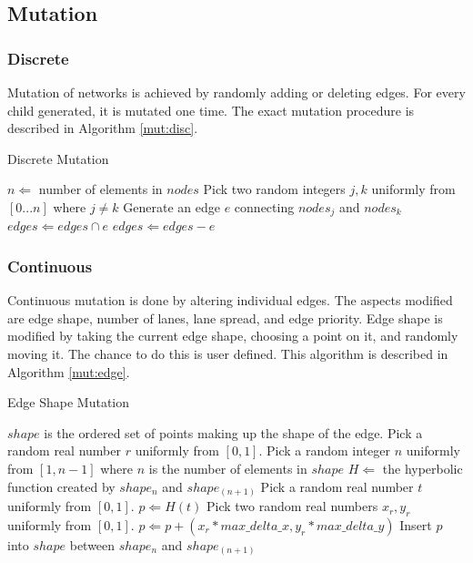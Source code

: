 \documentclass[11pt, oneside, notitlepage, draft]{article}
\begin{document}
        \subsection{Mutation}
            
            \subsubsection{Discrete}
            Mutation of networks is achieved by randomly adding or deleting edges. For every child generated, it is mutated one time. The exact mutation procedure is described in Algorithm \ref{mut:disc}.

            \begin{algorithm}
            \caption{Discrete Mutation}
            \label{mut:disc}
            \begin{algorithmic}
            \STATE $n \Leftarrow $ number of elements in $nodes$
            \STATE Pick two random integers $j, k$ uniformly from $[0...n]$ where $j \neq k$
            \STATE Generate an edge $e$ connecting $nodes_j$ and $nodes_k$
            \STATE $edges \Leftarrow edges \cap e$
            \ELSE
            \STATE $edges \Leftarrow edges - e$
            \ENDIF
            \end{algorithmic}
            \end{algorithm}

            \subsubsection{Continuous}
            Continuous mutation is done by altering individual edges. The aspects modified are edge shape, number of lanes, lane spread, and edge priority.
            Edge shape is modified by taking the current edge shape, choosing a point on it, and randomly moving it. The chance to do this is user defined. This algorithm is described in Algorithm \ref{mut:edge}.

            \begin{algorithm}
            \caption{Edge Shape Mutation}
            \label{mut:edge}
            \begin{algorithmic}
            \STATE $shape$ is the ordered set of points making up the shape of the edge.
            \STATE Pick a random real number $r$ uniformly from $[0, 1]$.
            \STATE Pick a random integer $n$ uniformly from $[1, n-1]$ where $n$ is the number of elements in $shape$
            \STATE $H \Leftarrow$ the hyperbolic function created by $shape_n$ and $shape_{(n+1)}$
            \STATE Pick a random real number $t$ uniformly from $[0, 1]$.
            \STATE $p \Leftarrow H(t)$
            \STATE Pick two random real numbers $x_r, y_r$ uniformly from $[0, 1]$.
            \STATE $p \Leftarrow p + (x_r * max\_delta\_x, y_r * max\_delta\_y)$
            \STATE Insert $p$ into $shape$ between $shape_n$ and $shape_{(n+1)}$
            \ENDIF
            \end{algorithmic}
            \end{algorithm}
\end{document}
